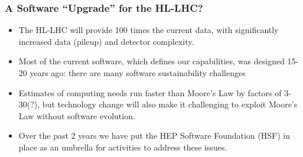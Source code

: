 \begin{frame}
\frametitle{A Software ``Upgrade'' for the HL-LHC?}

\begin{itemize}
\item The HL-LHC will provide 100 times the current data, with significantly increased data (pileup) and detector complexity.
\item Most of the current software, which defines our capabilities, was designed 15-20 years ago: there are many software sustainability challenges 
\item Estimates of computing needs run faster than Moore's Law by factors of 3-30(?), but technology change will also make it challenging to exploit Moore's Law without software evolution.
\item Over the past 2 years we have put the HEP Software Foundation (HSF) in place as an umbrella for activities to address these issues.
\end{itemize}

\end{frame}


